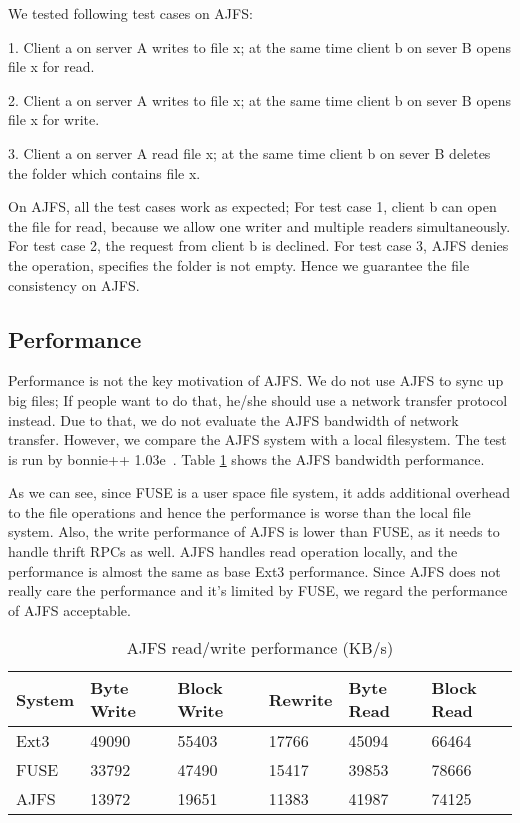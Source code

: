We tested following test cases on AJFS:

1. Client a on server A writes to file x; at the same time client b on sever B opens file x for read.

2. Client a on server A writes to file x; at the same time client b on sever B opens file x for write.

3. Client a on server A read file x; at the same time client b on sever B deletes the folder which contains file x.

On AJFS, all the test cases work as expected; For test case 1, client b can open the file for read, because we allow one writer and multiple readers simultaneously. For test case 2, the request from client b is declined. For test case 3, AJFS denies the operation, specifies the folder is not empty. Hence we guarantee the file consistency on AJFS.

\subsection{Performance}

Performance is not the key motivation of AJFS. We do not use AJFS to sync up big files; If people want to do that, he/she should use a network transfer protocol instead. Due to that, we do not evaluate the AJFS bandwidth of network transfer.
However, we compare the AJFS system with a local filesystem. The test is run by bonnie++ 1.03e~\cite{bonnie++}. Table \ref{table:performance} shows the AJFS bandwidth performance. 

As we can see, since FUSE is a user space file system, it adds additional overhead to the file operations and hence the performance is worse than the local file system.
Also, the write performance of AJFS is lower than FUSE, as it needs to handle thrift RPCs as well. AJFS handles read operation locally, and the performance is almost the same as base Ext3 performance.
Since AJFS does not really care the performance and it's limited by FUSE, we regard the performance of AJFS acceptable. 


\begin{table}[Ht]
\caption{AJFS read/write performance (KB/s)}
\centering
\begin{tabular}{|p{0.9cm}|p{0.9cm}|p{0.9cm}|p{0.9cm}|p{0.9cm}|p{0.9cm}|}
\hline\hline
System & Byte Write & Block Write & Rewrite & Byte Read & Block Read \\
\hline
Ext3	& 49090	& 55403	& 17766	& 45094	& 66464	\\
\hline
FUSE	& 33792	& 47490	& 15417	& 39853	& 78666	\\
\hline
AJFS	& 13972	& 19651	& 11383	& 41987	& 74125	\\
\hline
\end{tabular}
\label{table:performance}
\end{table}
